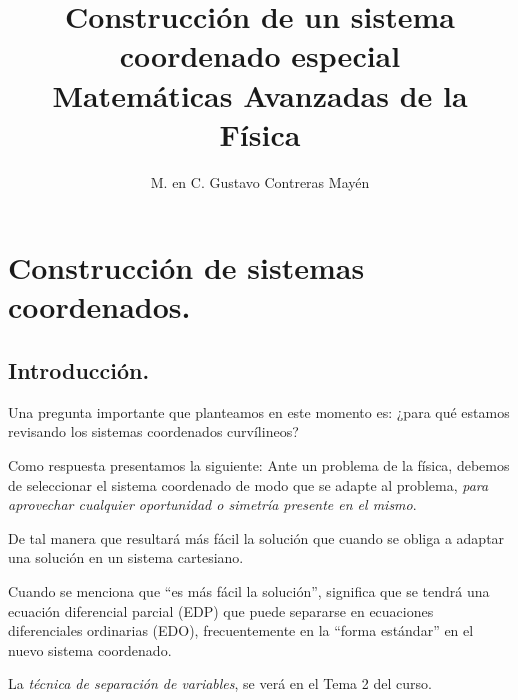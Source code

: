 
\usepackage{apacite}
\title{Construcción de un sistema coordenado especial \\[0.3em]  \large{Matemáticas Avanzadas de la Física}\vspace{-3ex}}
\author{M. en C. Gustavo Contreras Mayén}
\date{ }

\vspace{-4cm}
\maketitle
\fontsize{14}{14}\selectfont
\tableofcontents
\newpage
\section{Construcción de sistemas coordenados.}
\subsection{Introducción.}
Una pregunta importante que planteamos en este momento es: ¿para qué estamos revisando los sistemas coordenados curvílineos?
\par
Como respuesta presentamos la siguiente: Ante un problema de la física, debemos de seleccionar el sistema coordenado de modo que se adapte al problema, \emph{para aprovechar cualquier oportunidad o simetría presente en el mismo}.
\par
De tal manera que resultará más fácil la solución que cuando se obliga a adaptar una solución en un sistema cartesiano.
\par
Cuando se menciona que \enquote{es más fácil la solución}, significa que se tendrá una ecuación diferencial parcial (EDP) que puede separarse en ecuaciones diferenciales ordinarias (EDO), frecuentemente en la \enquote{forma estándar} en el nuevo sistema coordenado.
\par
La \emph{técnica de separación de variables}, se verá en el Tema 2 del curso.
